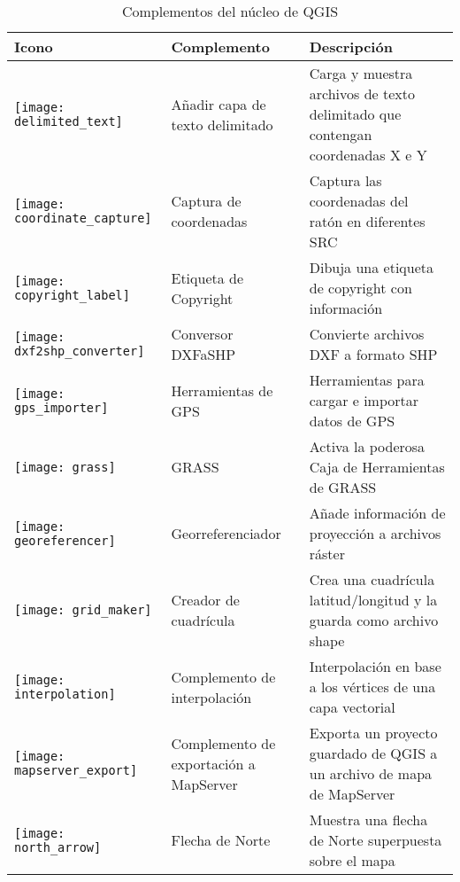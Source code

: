 \begin{minipage}{\textwidth}
\begin{table}[H]
\centering
\caption{Complementos del núcleo de QGIS}\label{tab:core_plugins}\medskip
\small
 \begin{tabular}{|l|l|p{4in}|}
\hline \textbf{Icono} & \textbf{Complemento} & \textbf{Descripción}\\
\hline
\texttt{[image: delimited\_text]}
 & Añadir capa de texto delimitado \index{plugins!delimited text} & Carga y muestra archivos de texto delimitado que contengan coordenadas X e Y\\
\hline
\texttt{[image: coordinate\_capture]}
 & Captura de coordenadas \index{plugins!coordinate capture}& Captura las coordenadas del ratón en diferentes SRC\\
\hline 
\texttt{[image: copyright\_label]}
 & Etiqueta de Copyright \index{plugins!copyright}& Dibuja una etiqueta de copyright con información\\
\hline 
\texttt{[image: dxf2shp\_converter]}
 & Conversor DXFaSHP \index{plugins!DXF2Shape}& Convierte archivos DXF a formato SHP\\
\hline
\texttt{[image: gps\_importer]}
 & Herramientas de GPS \index{plugins!gps}& Herramientas para cargar e importar datos de GPS\\
\hline
\texttt{[image: grass]}
 & GRASS \index{plugin!grass toolbox} & Activa la poderosa Caja de Herramientas de GRASS\\
\hline
\texttt{[image: georeferencer]}
 & Georreferenciador \index{plugin!georeferencer} & Añade información de proyección a archivos ráster\\
\hline
\texttt{[image: grid\_maker]}
 & Creador de cuadrícula \index{plugins!graticule}& Crea una cuadrícula latitud/longitud y la guarda como archivo shape\\
\hline
\texttt{[image: interpolation]}
& Complemento de interpolación \index{plugins!Interpolation}& Interpolación en base a los vértices de una capa vectorial\\
\hline
\texttt{[image: mapserver\_export]}
& Complemento de exportación a MapServer \index{plugins!MapServer Export}& Exporta un proyecto guardado de QGIS a un archivo de mapa de MapServer \\
\hline
\texttt{[image: north\_arrow]}
& Flecha de Norte \index{plugins!north arrow}& Muestra una flecha de Norte superpuesta sobre el mapa\\

\end{tabular}
\end{table}
\end{minipage}
